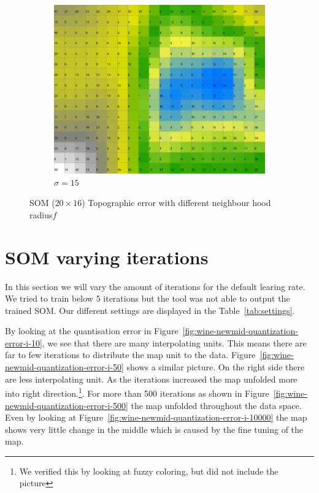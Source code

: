 \documentclass{acm_proc_article-sp}
\begin{document}
\begin{figure}
\begin{subfigure}[b]{0.30\linewidth}
        \includegraphics[width=\linewidth]{img/wine-newmid-activity-histogram-sigma-15}
        \caption{$\sigma=15$}
    \end{subfigure}
    \caption{SOM ($20\times16$) Topographic error with different neighbour hood radius$f$}
    \label{fig:wine-newmid-activity-histogram-sigma}
\end{figure}

\section{SOM varying iterations}

In this section we will vary the amount of iterations for the default learing rate.
We tried to train below 5 iterations but the tool was not able to output the trained SOM.
Our different settings are displayed in the Table~\ref{tab:settings}.

By looking at the quantisation error in Figure~\ref{fig:wine-newmid-quantization-error-i-10}, 
we see that there are many interpolating units. This means there are far to few iterations to
distribute the map unit to the data. Figure~\ref{fig:wine-newmid-quantization-error-i-50} shows
a similar picture. On the right side there are less interpolating unit. As the iterations increased
the map unfolded more into right direction.\footnote{We verified this by looking at fuzzy coloring, but did not include the picture}.
For more than 500 iterations as shown in Figure~\ref{fig:wine-newmid-quantization-error-i-500} the map unfolded throughout the data space.
Even by looking at Figure~\ref{fig:wine-newmid-quantization-error-i-10000} the map shows very little change in the middle which
is caused by the fine tuning of the map.
\end{document}
